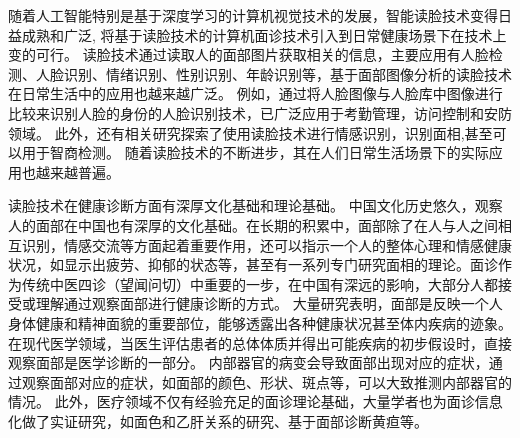 % 
随着人工智能特别是基于深度学习的计算机视觉技术的发展，智能读脸技术变得日益成熟和广泛, 将基于读脸技术的计算机面诊技术引入到日常健康场景下在技术上变的可行。
读脸技术通过读取人的面部图片获取相关的信息，主要应用有人脸检测、人脸识别、情绪识别、性别识别、年龄识别等，基于面部图像分析的读脸技术在日常生活中的应用也越来越广泛。
例如，通过将人脸图像与人脸库中图像进行比较来识别人脸的身份的人脸识别技术\cite{Zhang2016Joint, Schroff2015FaceNet}，已广泛应用于考勤管理\cite{surekha2017attendance}，访问控制\cite{atick2000continuous}和安防领域\cite{liu2005ibotguard}。
此外，还有相关研究探索了使用读脸技术进行情感识别\cite{corneanu2016survey}，识别面相\cite{Li2007Online, Tempark2012Chinese},甚至可以用于智商检测\cite{Kleisner2014Perceived}。
随着读脸技术的不断进步，其在人们日常生活场景下的实际应用也越来越普遍。

读脸技术在健康诊断方面有深厚文化基础和理论基础。
中国文化历史悠久，观察人的面部在中国也有深厚的文化基础。在长期的积累中，面部除了在人与人之间相互识别，情感交流等方面起着重要作用，还可以指示一个人的整体心理和情感健康状况，如显示出疲劳、抑郁的状态等，甚至有一系列专门研究面相的理论。面诊作为传统中医四诊（望闻问切）中重要的一步，在中国有深远的影响，大部分人都接受或理解通过观察面部进行健康诊断的方式。
大量研究表明，面部是反映一个人身体健康和精神面貌的重要部位，能够透露出各种健康状况甚至体内疾病的迹象。
在现代医学领域，当医生评估患者的总体体质并得出可能疾病的初步假设时，直接观察面部是医学诊断的一部分\cite{Clifford2006Shortliffe}。
内部器官的病变会导致面部出现对应的症状，通过观察面部对应的症状，如面部的颜色、形状、斑点等，可以大致推测内部器官的情况\cite{杨淑芳2002伤寒六经辨证初探}。
此外，医疗领域不仅有经验充足的面诊理论基础，大量学者也为面诊信息化做了实证研究，如面色和乙肝关系的研究\cite{杨宏志2007慢性乙型肝炎肝硬化中医面部五色诊断与临床病理的相关性研究, Li2008Therapeutic}、基于面部诊断黄疸\cite{艾英1998黄疸病人面部色泽定量实验研究}等。


% 


